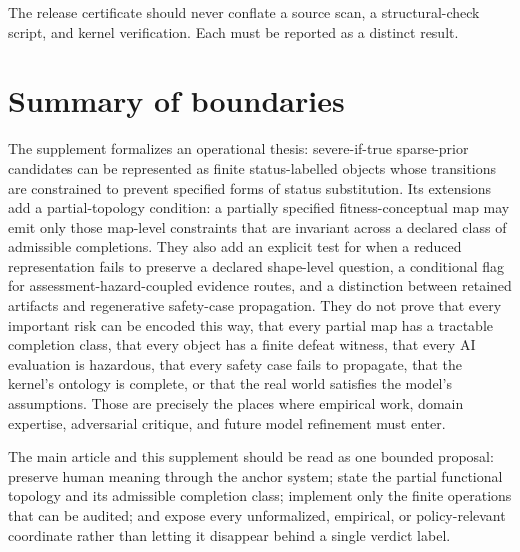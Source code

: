 \documentclass[10pt]{article}
\begin{document}
The release certificate should never conflate a source scan, a structural-check script, and kernel verification. Each must be reported as a distinct result.

\section{Summary of boundaries}

The supplement formalizes an operational thesis: severe-if-true sparse-prior candidates can be represented as finite status-labelled objects whose transitions are constrained to prevent specified forms of status substitution. Its  extensions add a partial-topology condition: a partially specified fitness-conceptual map may emit only those map-level constraints that are invariant across a declared class of admissible completions. They also add an explicit test for when a reduced representation fails to preserve a declared shape-level question, a conditional flag for assessment-hazard-coupled evidence routes, and a distinction between retained artifacts and regenerative safety-case propagation. They do not prove that every important risk can be encoded this way, that every partial map has a tractable completion class, that every object has a finite defeat witness, that every AI evaluation is hazardous, that every safety case fails to propagate, that the kernel's ontology is complete, or that the real world satisfies the model's assumptions. Those are precisely the places where empirical work, domain expertise, adversarial critique, and future model refinement must enter.

The main article and this supplement should be read as one bounded proposal: preserve human meaning through the anchor system; state the partial functional topology and its admissible completion class; implement only the finite operations that can be audited; and expose every unformalized, empirical, or policy-relevant coordinate rather than letting it disappear behind a single verdict label.
\end{document}
